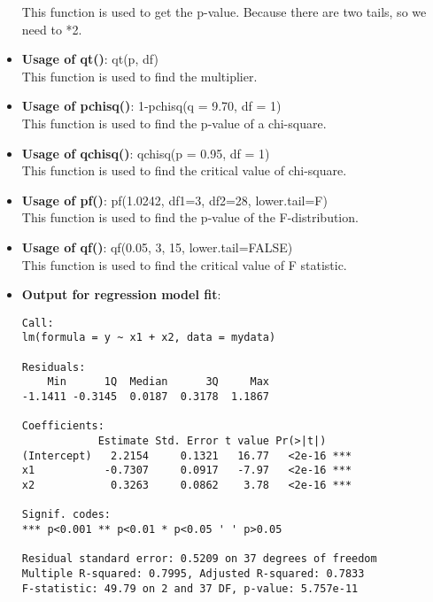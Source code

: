 \documentclass[12pt]{article}
\begin{document}
\begin{itemize}
This function is used to get the p-value. Because there are two tails, so we need to *2.

\item \textbf{Usage of qt()}: qt(p, df) \\
This function is used to find the multiplier.

\item \textbf{Usage of pchisq()}: 1-pchisq(q = 9.70, df = 1) \\
This function is used to find the p-value of a chi-square.

\item \textbf{Usage of qchisq()}: qchisq(p = 0.95, df = 1) \\
This function is used to find the critical value of chi-square.

\item \textbf{Usage of pf()}: pf(1.0242, df1=3, df2=28, lower.tail=F) \\
This function is used to find the p-value of the F-distribution.

\item \textbf{Usage of qf()}: qf(0.05, 3, 15, lower.tail=FALSE) \\
This function is used to find the critical value of F statistic.

\item \textbf{Output for regression model fit}:

\begin{mdframed}[backgroundcolor=gray!15, linecolor=black]
\begin{verbatim}
Call:
lm(formula = y ~ x1 + x2, data = mydata)

Residuals:
    Min      1Q  Median      3Q     Max 
-1.1411 -0.3145  0.0187  0.3178  1.1867 

Coefficients:
            Estimate Std. Error t value Pr(>|t|)    
(Intercept)   2.2154     0.1321   16.77   <2e-16 ***
x1           -0.7307     0.0917   -7.97   <2e-16 ***
x2            0.3263     0.0862    3.78   <2e-16 ***

Signif. codes:  
*** p<0.001 ** p<0.01 * p<0.05 ' ' p>0.05

Residual standard error: 0.5209 on 37 degrees of freedom
Multiple R-squared: 0.7995, Adjusted R-squared: 0.7833 
F-statistic: 49.79 on 2 and 37 DF, p-value: 5.757e-11
\end{verbatim}
\end{mdframed}


\end{itemize}
\end{document}

